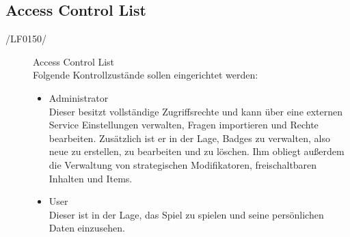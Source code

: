 \documentclass[11pt,a4paper]{scrreprt}
\begin{document}
\subsection{Access Control List}
\begin{description}
\item[/LF0150/] Access Control List \\
Folgende Kontrollzustände sollen eingerichtet werden:
	\begin{itemize}
	\item Administrator \\
	Dieser besitzt vollständige Zugriffsrechte und kann über eine externen Service Einstellungen verwalten, Fragen 				importieren und Rechte bearbeiten. Zusätzlich ist er in der Lage, Badges zu verwalten, also neue zu erstellen, zu 				bearbeiten und zu löschen. Ihm obliegt außerdem die Verwaltung von strategischen Modifikatoren, freischaltbaren 			Inhalten und Items.
	\item User \\
	Dieser ist in der Lage, das Spiel zu spielen und seine persönlichen Daten einzusehen.
	\end{itemize}

\end{description}
\end{document}
